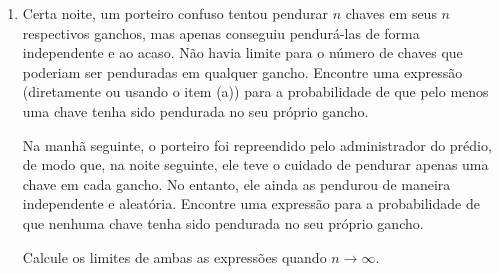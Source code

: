 \documentclass[12pt,portuguese]{article}
\theoremstyle{definition}
\begin{document}
\begin{enumerate}[label={\arabic*.}]
\begin{enumerate}[label=(\alph*), ref=\alph*]
\(A_1, A_2, \dots, A_n\), que
\[
\begin{array}{ll}
\qquad  &\displaystyle\mathbb{P}\left(\bigcup_{i=1}^n A_i\right)
=
\sum_i \mathbb{P}(A_i) - \sum_{i<j} \mathbb{P}(A_i \cap A_j) +
\\[0.5cm]
&\displaystyle \qquad\qquad\qquad \qquad \qquad
\sum_{i<j<k} \mathbb{P}(A_i \cap A_j \cap A_k) - \dots +
(-1)^{n+1} \mathbb{P}\left(\bigcap_i A_i\right).
\end{array}
\]
\item Certa noite, um porteiro confuso tentou pendurar \(n\) chaves
em seus \(n\) respectivos ganchos, mas apenas conseguiu
pendurá-las de forma independente e ao acaso. Não havia limite
para o número de chaves que poderiam ser penduradas em qualquer
gancho. Encontre uma expressão (diretamente ou usando o item
(a)) para a probabilidade de que pelo menos uma chave tenha sido
pendurada no seu próprio gancho.

Na manhã seguinte, o porteiro foi repreendido pelo administrador
do prédio, de modo que, na noite seguinte, ele teve o cuidado de
pendurar apenas uma chave em cada gancho. No entanto, ele ainda
as pendurou de maneira independente e aleatória. Encontre uma
expressão para a probabilidade de que nenhuma chave tenha sido
pendurada no seu próprio gancho.

Calcule os limites de ambas as expressões quando \(n \to
\infty\).


\end{enumerate}
\end{enumerate}
\end{document}
